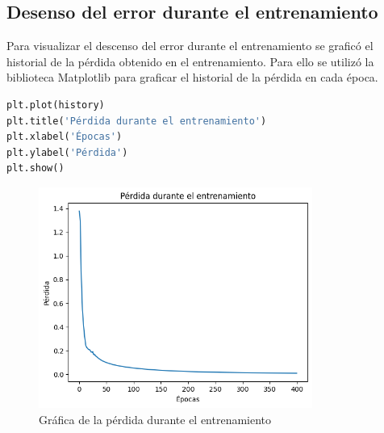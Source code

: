 \documentclass{article}
\begin{document}
    \subsection{Desenso del error durante el entrenamiento}\label{subsec:desenso-del-error-durante-el-entrenamiento}
    Para visualizar el descenso del error durante el entrenamiento se graficó el historial de la pérdida obtenido en el entrenamiento.
    Para ello se utilizó la biblioteca Matplotlib para graficar el historial de la pérdida en cada época.
    \begin{lstlisting}[language=Python, caption={Gráfica de la pérdida durante el entrenamiento}, label={lst:grafica_perdida}]
plt.plot(history)
plt.title('Pérdida durante el entrenamiento')
plt.xlabel('Épocas')
plt.ylabel('Pérdida')
plt.show()
    \end{lstlisting}
    \begin{figure}[h]
        \centering
        \includegraphics[width=0.8\textwidth]{img/loss}
        \caption{Gráfica de la pérdida durante el entrenamiento}
        \label{fig:plot_loss}
    \end{figure}
    \clearpage
\end{document}
